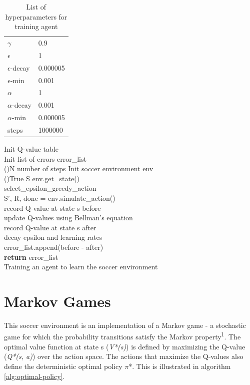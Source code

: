 \documentclass[conference]{IEEEtran}
\begin{document}
\begin{table}[]
    \label{table:hyperparameters}
    \caption{List of hyperparameters for training agent}
    \hline
    \begin{tabular}{ll}
    $\gamma$ & 0.9 \\
    $\epsilon$ & 1 \\
    $\epsilon$-decay & 0.000005 \\
    $\epsilon$-min & 0.001 \\
    $\alpha$ & 1 \\
    $\alpha$-decay & 0.001 \\
    $\alpha$-min & 0.000005 \\
    steps & 1000000 \\
    \end{tabular}
    \hline
\end{table}

\begin{algorithm}
    \label{alg:training}
    \SetAlgoLined
    Init Q-value table \\
    Init list of errors \doteq error\_list \\
    \For(){N number of steps}{
        Init soccer environment \doteq env \\
        \While(){True}{
            S \doteq env.get\_state() \\
             \doteq select\_epsilon\_greedy\_action \\
            S', R, done = env.simulate\_action() \\
            record Q-value at state s \doteq before \\
            update Q-values using Bellman's equation \\
            record Q-value at state s \doteq after \\
            decay epsilon and learning rates \\
            error\_list.append(before - after) \\
        }
    }
    \textbf{return} error\_list \\
    \caption{Training an agent to learn the soccer environment}
\end{algorithm}

\section{Markov Games}
This soccer environment is an implementation of a Markov game - a stochastic game for which the probability transitions satisfy the Markov property\textsuperscript{1}. The optimal value function at state s (\textit{V*(s)}) is defined by maximizing the Q-value (\textit{Q*(s, a)}) over the action space. The actions that maximize the Q-values also define the deterministic optimal policy $\pi$*. This is illustrated in algorithm \ref{alg:optimal-policy}.
\end{document}
